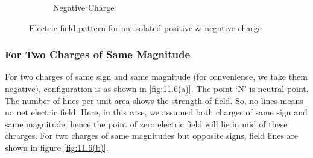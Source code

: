 \begin{figure}[htbp]
\begin{subfigure}[t]{0.3\textwidth}
      \caption{Negative Charge}
      \label{fig:11.5b}
  \end{subfigure}
  \caption[]{Electric field pattern for an isolated positive \& negative charge}
  \label{fig:11.5}
\end{figure}

\subsubsection{For Two Charges of Same Magnitude}
For two charges of same sign and same magnitude (for convenience,
we take them negative), configuration is as shown in \ref{fig:11.6(a)}.
The point `N’ is neutral point. The number of lines per unit area 
shows the strength of field. So, no lines means no net electric field.
Here, in this case, we assumed both charges of same sign and same magnitude,
hence the point of zero electric field will lie in mid of these chrarges.
For two charges of same magnitudes but opposite signs,
field lines are shown in figure \ref{fig:11.6(b)}.

